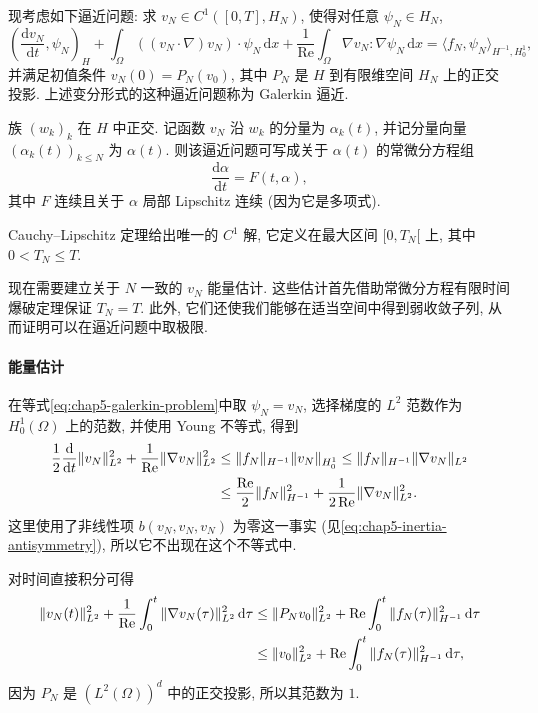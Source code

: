 现考虑如下逼近问题: 求 $v_N\in C^1([0,T],H_N)$, 使得对任意 $\psi_N\in H_N$,
\begin{equation}
 \left(\frac{\mathrm d v_N}{\mathrm dt},\psi_N\right)_H
 +\int_\Omega((v_N\cdot\nabla)v_N)\cdot\psi_N\,\mathrm dx
 +\frac1{\operatorname{Re}}\int_\Omega\nabla v_N:\nabla\psi_N\,\mathrm dx
 =\langle f_N,\psi_N\rangle_{H^{-1},H_0^1},
\label{eq:chap5-galerkin-problem}
\end{equation}
并满足初值条件 $v_N(0)=P_N(v_0)$, 其中 $P_N$ 是 $H$ 到有限维空间 $H_N$ 上的正交投影. 上述变分形式的这种逼近问题称为 Galerkin 逼近.

族 $(w_k)_k$ 在 $H$ 中正交. 记函数 $v_N$ 沿 $w_k$ 的分量为 $\alpha_k(t)$, 并记分量向量 $(\alpha_k(t))_{k\leq N}$ 为 $\alpha(t)$. 则该逼近问题可写成关于 $\alpha(t)$ 的常微分方程组
\[
 \frac{\mathrm d\alpha}{\mathrm dt}=F(t,\alpha),
\]
其中 $F$ 连续且关于 $\alpha$ 局部 Lipschitz 连续 (因为它是多项式).

Cauchy--Lipschitz 定理给出唯一的 $C^1$ 解, 它定义在最大区间 $[0,T_N[$ 上, 其中 $0<T_N\leq T$.

现在需要建立关于 $N$ 一致的 $v_N$ 能量估计. 这些估计首先借助常微分方程有限时间爆破定理保证 $T_N=T$. 此外, 它们还使我们能够在适当空间中得到弱收敛子列, 从而证明可以在逼近问题中取极限.

\paragraph{能量估计}

在等式\eqref{eq:chap5-galerkin-problem}中取 $\psi_N=v_N$, 选择梯度的 $L^2$ 范数作为 $H_0^1(\Omega)$ 上的范数, 并使用 Young 不等式, 得到
\begin{align}
 \frac12\frac{\mathrm d}{\mathrm dt}\|v_N\|_{L^2}^2
 +\frac1{\operatorname{Re}}\|\nabla v_N\|_{L^2}^2
 &\leq\|f_N\|_{H^{-1}}\|v_N\|_{H_0^1}
 \leq\|f_N\|_{H^{-1}}\|\nabla v_N\|_{L^2}\notag\\
 &\leq\frac{\operatorname{Re}}2\|f_N\|_{H^{-1}}^2
 +\frac1{2\operatorname{Re}}\|\nabla v_N\|_{L^2}^2.
\label{eq:chap5-galerkin-differential-energy}
\end{align}
这里使用了非线性项 $b(v_N,v_N,v_N)$ 为零这一事实 (见\eqref{eq:chap5-inertia-antisymmetry}), 所以它不出现在这个不等式中.

对时间直接积分可得
\begin{align}
 \|v_N(t)\|_{L^2}^2
 +\frac1{\operatorname{Re}}\int_0^t\|\nabla v_N(\tau)\|_{L^2}^2\,\mathrm d\tau
 &\leq\|P_Nv_0\|_{L^2}^2
 +\operatorname{Re}\int_0^t\|f_N(\tau)\|_{H^{-1}}^2\,\mathrm d\tau\notag\\
 &\leq\|v_0\|_{L^2}^2
 +\operatorname{Re}\int_0^t\|f_N(\tau)\|_{H^{-1}}^2\,\mathrm d\tau,
\label{eq:chap5-galerkin-integrated-energy}
\end{align}
因为 $P_N$ 是 $(L^2(\Omega))^d$ 中的正交投影, 所以其范数为 $1$.

